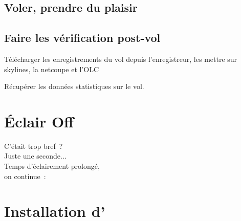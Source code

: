 \documentclass[french, a4paper, 12pt]{refrep}
\begin{document}
\subsection*{\textcolor{flashblue}{Voler, prendre du plaisir}}

\subsection*{\textcolor{flashblue}{Faire les vérification post-vol}}
\begin{compactitem}
\item Télécharger les enregistrements du vol depuis l'enregistreur, les mettre sur skylines, la netcoupe et l'OLC
\item Récupérer les données statistiques sur le vol.
\end{compactitem}

\section*{{\color[rgb]{.9,.85,0}Éclair} Off}

\hspace*{1cm} C'était trop bref~?\\
\hspace*{4cm} Juste une seconde...\\
\hspace*{6cm} Temps d'éclairement prolongé,\\
\hspace*{10cm} on continue~:


\setlength{\parskip}{0.3\baselineskip}
\newpage
\section{Installation d'\xc}\label{ch:XCSinstall}

\end{document}
